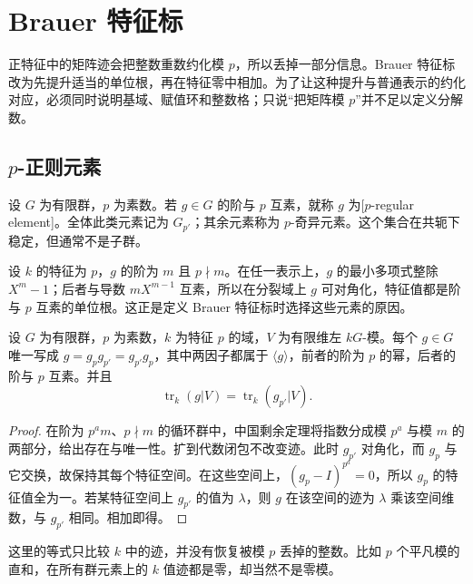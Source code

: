 
\section{Brauer 特征标}
\label{b5:sec:0803}


%
%

正特征中的矩阵迹会把整数重数约化模 \(p\)，所以丢掉一部分信息。Brauer 特征标改为先提升适当的单位根，再在特征零中相加。为了让这种提升与普通表示的约化对应，必须同时说明基域、赋值环和整数格；只说“把矩阵模 \(p\)”并不足以定义分解数。

\subsection{\texorpdfstring{\(p\)-正则元素}{p-正则元素}}
\label{b5:subsec:0803:01}

\begin{definition}\label{b5:def:p-regular-element}
	设 \(G\) 为有限群，\(p\) 为素数。若 \(g\in G\) 的阶与 \(p\) 互素，就称 \(g\) 为[\(p\)-regular element]。全体此类元素记为 \(G_{p'}\)；其余元素称为 \(p\)-奇异元素。这个集合在共轭下稳定，但通常不是子群。
\end{definition}
设 \(k\) 的特征为 \(p\)，\(g\) 的阶为 \(m\) 且 \(p\nmid m\)。在任一表示上，\(g\) 的最小多项式整除 \(X^m-1\)；后者与导数 \(mX^{m-1}\) 互素，所以在分裂域上 \(g\) 可对角化，特征值都是阶与 \(p\) 互素的单位根。这正是定义 Brauer 特征标时选择这些元素的原因。
\begin{lemma}\label{b5:lem:modular-trace-regular-part}
	设 \(G\) 为有限群，\(p\) 为素数，\(k\) 为特征 \(p\) 的域，\(V\) 为有限维左 \(kG\)-模。每个 \(g\in G\) 唯一写成 \(g=g_pg_{p'}=g_{p'}g_p\)，其中两因子都属于 \(\langle g\rangle\)，前者的阶为 \(p\) 的幂，后者的阶与 \(p\) 互素。并且
	\[
		\operatorname{tr}_k(g|V)=\operatorname{tr}_k(g_{p'}|V).
	\]
\end{lemma}
\begin{proof}
	在阶为 \(p^a m\)、\(p\nmid m\) 的循环群中，中国剩余定理将指数分成模 \(p^a\) 与模 \(m\) 的两部分，给出存在与唯一性。扩到代数闭包不改变迹。此时 \(g_{p'}\) 对角化，而 \(g_p\) 与它交换，故保持其每个特征空间。在这些空间上，\((g_p-I)^{p^a}=0\)，所以 \(g_p\) 的特征值全为一。若某特征空间上 \(g_{p'}\) 的值为 \(\lambda\)，则 \(g\) 在该空间的迹为 \(\lambda\) 乘该空间维数，与 \(g_{p'}\) 相同。相加即得。
\end{proof}
这里的等式只比较 \(k\) 中的迹，并没有恢复被模 \(p\) 丢掉的整数。比如 \(p\) 个平凡模的直和，在所有群元素上的 \(k\) 值迹都是零，却当然不是零模。

